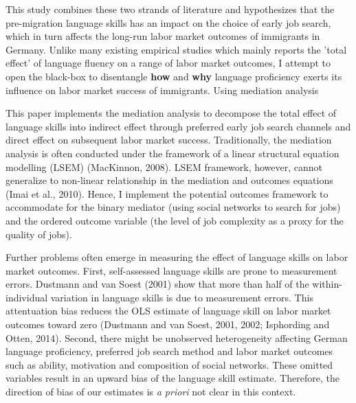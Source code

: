 \documentclass[12pt,a4paper]{article}
\begin{document}
This study combines these two strands of literature and hypothesizes that the pre-migration language skills has an impact on the choice of early job search, which in turn affects the long-run labor market outcomes of immigrants in Germany. Unlike many existing empirical studies which mainly reports the 'total effect' of language fluency on a range of labor market outcomes, I attempt to open the black-box to disentangle \textbf{how} and \textbf{why} language proficiency exerts its influence on labor market success of immigrants. Using mediation analysis


This paper implements the mediation analysis to decompose the total effect of language skills into indirect effect through preferred early job search channels and direct effect on subsequent labor market success. Traditionally, the mediation analysis is often conducted under the framework of a linear structural equation modelling (LSEM) (MacKinnon, 2008). LSEM framework, however, cannot generalize to non-linear relationship in the mediation and outcomes equations (Imai et al., 2010). Hence, I implement the potential outcomes framework to accommodate for the binary mediator (using social networks to search for jobs) and the ordered outcome variable (the level of job complexity as a proxy for the quality of jobs).

Further problems often emerge in measuring the effect of language skills on labor market outcomes. First, self-assessed language skills are prone to measurement errors. Dustmann and van Soest (2001) show that more than half of the within-individual variation in language skills is due to measurement errors. This attentuation bias reduces the OLS estimate of language skill on labor market outcomes toward zero (Dustmann and van Soest, 2001, 2002; Isphording and Otten, 2014). Second, there might be unobserved heterogeneity affecting German language proficiency, preferred job search method and labor market outcomes such as ability, motivation and composition of social networks. These omitted variables result in an upward bias of the language skill estimate. Therefore, the direction of bias of our estimates is \textit{a priori} not clear in this context.
\end{document}
